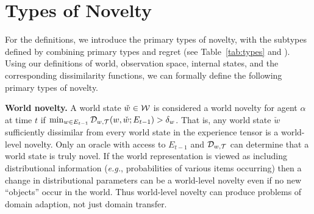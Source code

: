 

\section{Types of Novelty} 
For the definitions, we introduce the primary types of novelty, with the subtypes defined by combining primary types and regret (see Table~\ref{tab:types} and \cite{Boult-eta-al-novelty20}).
Using our definitions of world, observation space, internal states, and the corresponding dissimilarity functions, we can formally define the following primary types of novelty.  
%


{\bf World novelty.} A world state $\check{w}\in{\cal W}$ is considered a world novelty for agent $\alpha$ at time $t$ if $\min_{w \in E_{t-1}} {\cal D}_{w,{\cal T}} (w,\check{w}; E_{t-1}) > \delta_w$. That is, any world state $\check{w}$ sufficiently dissimilar from every world state in the experience tensor is a world-level novelty. Only an oracle with access to $E_{t-1}$ and ${\cal D}_{w,{\cal T}}$ can determine that a world state is truly novel. If the world representation is viewed as including distributional information (\textit{e.g.}, probabilities of various items occurring) then a change in distributional parameters can be a world-level novelty even if no new ``objects'' occur in the world. Thus world-level novelty can produce problems of domain adaption, not just domain transfer.

